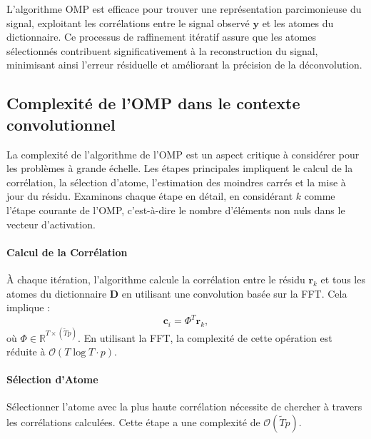 \documentclass[9pt,a4paper,twoside]{rho}
\begin{document}
L'algorithme OMP est efficace pour trouver une représentation parcimonieuse du signal, exploitant les corrélations entre le signal observé $\mathbf{y}$ et les atomes du dictionnaire. Ce processus de raffinement itératif assure que les atomes sélectionnés contribuent significativement à la reconstruction du signal, minimisant ainsi l'erreur résiduelle et améliorant la précision de la déconvolution.

\subsection{Complexité de l'OMP dans le contexte convolutionnel}

La complexité de l'algorithme de l'OMP est un aspect critique à considérer pour les problèmes à grande échelle. Les étapes principales impliquent le calcul de la corrélation, la sélection d'atome, l'estimation des moindres carrés et la mise à jour du résidu. Examinons chaque étape en détail, en considérant $k$ comme l'étape courante de l'OMP, c'est-à-dire le nombre d'éléments non nuls dans le vecteur d'activation.

\paragraph{Calcul de la Corrélation}
À chaque itération, l'algorithme calcule la corrélation entre le résidu $\mathbf{r}_k$ et tous les atomes du dictionnaire $\mathbf{D}$ en utilisant une convolution basée sur la FFT. Cela implique :
\begin{equation}
    \mathbf{c}_i = \Phi^T \mathbf{r}_k,
\end{equation}
où $\Phi \in \mathbb{R}^{T \times (\widetilde{T}p)}$. En utilisant la FFT, la complexité de cette opération est réduite à $\mathcal{O}(T \log T \cdot p)$.

\paragraph{Sélection d'Atome}
Sélectionner l'atome avec la plus haute corrélation nécessite de chercher à travers les corrélations calculées. Cette étape a une complexité de $\mathcal{O}(\widetilde{T}p)$.
\end{document}
